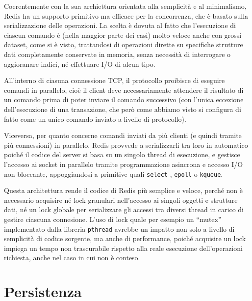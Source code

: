 Coerentemente con la sua archiettura orientata alla semplicità e al minimalismo, Redis ha un
supporto primitivo ma efficace per la concorrenza, che è basato sulla serializzazione delle
operazioni. La scelta è dovuta al fatto che l'esecuzione di ciascun comando è (nella maggior parte
dei casi) molto veloce anche con grossi dataset, come si è visto, trattandosi di operazioni dirette
su specifiche strutture dati completamente conservate in memoria, senza necessità di interrogare o
aggioranare indici, né effettuare I/O di alcun tipo.

All'interno di ciasuna connessione TCP, il protocollo proibisce di eseguire comandi in parallelo,
cioè il client deve necessariamente attendere il risultato di un comando prima di poter inviare il
comando successivo (con l'unica eccezione dell'esecuzione di una transazione, che però come abbiamo
visto si configura di fatto come un unico comando inviato a livello di protocollo).

Viceversa, per quanto concerne comandi inviati da più clienti (e quindi tramite più connessioni) in
parallelo, Redis provvede a serializzarli tra loro in automatico poiché il codice del server si
basa su un singolo thread di esecuzione, e gestisce l'accesso ai socket in parallelo tramite
programmazione asincrona e accesso I/O non bloccante, appoggiandosi a primitive quali \verb|select| 
\cite{select}, \verb|epoll| \cite{epoll} o \verb|kqueue|.

Questa architettura rende il codice di Redis più semplice e veloce, perché non è necessario
acquisire né lock granulari nell'accesso ai singoli oggetti e strutture dati, né un lock globale
per serializzare gli accessi tra diversi thread in carico di gestire ciascuna connesione. L'uso di
lock quale per esempio un ``mutex'' implementato dalla libreria \verb|pthread| avrebbe un impatto non
solo a livello di semplicità di codice sorgente, ma anche di performance, poiché acquisire un lock
impiega un tempo non trascurabile rispetto alla reale esecuzione dell'operazioni richiesta, anche
nel caso in cui non è conteso.

\section{Persistenza}




